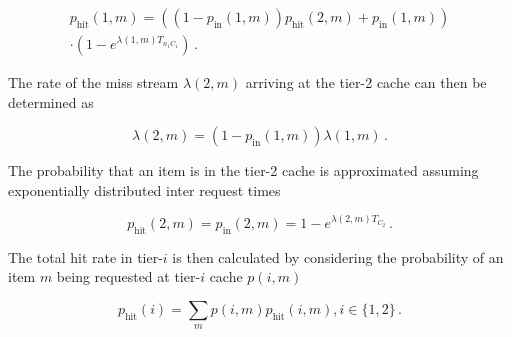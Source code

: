 \begin{multline}
p_\text{hit}(1,m) = ((1-p_\text{in}(1,m))p_\text{hit}(2,m) + p_\text{in}(1,m)) \\ \cdot(1-e^{\lambda(1,m)T_{n_1 C_1}}) \, .
\end{multline}

The rate of the miss stream $\lambda(2,m)$ arriving at the tier-2 cache can then be determined as

\begin{equation}
\lambda(2,m) = (1-p_\text{in}(1,m))\lambda(1,m) \, .
\end{equation}

The probability that an item is in the tier-2 cache is approximated assuming exponentially distributed inter request times

\begin{equation}
p_\text{hit}(2,m) = p_\text{in}(2,m) = 1-e^{\lambda(2,m)T_{C_2}} \, .
\end{equation}

The total hit rate in tier-$i$ is then calculated by considering the probability of an item $m$ being requested at tier-$i$ cache $p(i,m)$

\begin{equation}
p_\text{hit}(i) = \sum_{m}p(i,m)p_\text{hit}(i,m), i\in\{1,2\} \, .
\end{equation}





